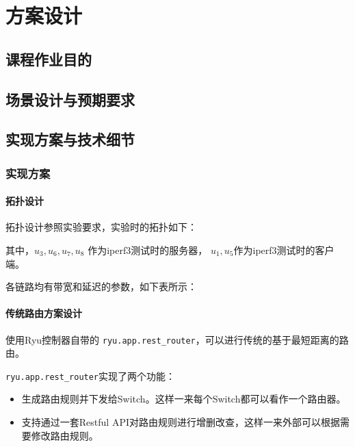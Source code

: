 \chapter{方案设计}
\label{cha:example}

\setmonofont{Cascadia Code}
\newfontfamily{}
\newfontfamily{}

\lstset{
    basicstyle = \small\ttfamily,
    tabsize=4
}

\section{课程作业目的}

\section{场景设计与预期要求}

\section{实现方案与技术细节}

\subsection{实现方案}

\subsubsection{拓扑设计}

拓扑设计参照实验要求，实验时的拓扑如下：



其中，$u_{3},u_{6},u_{7},u_{8}$ 作为iperf3测试时的服务器，
$u_{1},u_{5}$作为iperf3测试时的客户端。

各链路均有带宽和延迟的参数，如下表所示：



\subsubsection{传统路由方案设计}

使用Ryu控制器自带的 \texttt{ryu.app.rest\_router}，可以进行传统的基于最短距离的路由。

\texttt{ryu.app.rest\_router}实现了两个功能：

\begin{itemize}
	\item 生成路由规则并下发给Switch。这样一来每个Switch都可以看作一个路由器。
	\item 支持通过一套Restful API对路由规则进行增删改查，这样一来外部可以根据需要修改路由规则。
\end{itemize}


